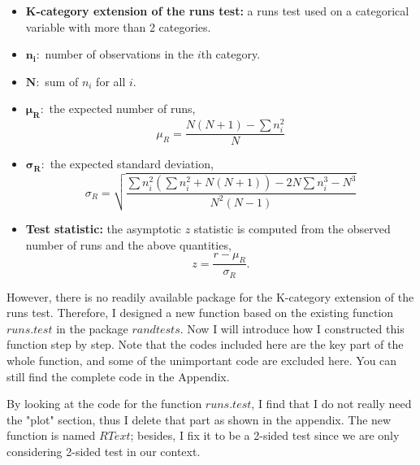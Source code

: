 \documentclass[12pt]{article}
\theoremstyle{plain}
\theoremstyle{definition}
\theoremstyle{remark}
\begin{document}
\begin{itemize}
    \item \textbf{K-category extension of the runs test:} a runs test used on a categorical variable with more than 2 categories.
    \item $\mathbf{n_i}:$ number of observations in the $i$th category.
    \item $\mathbf N:$ sum of $n_i$ for all $i$.
    \item $\mathbf{\mu_R}:$ the expected number of runs,
    $$\mu_R=\frac{N(N+1)-\sum n_i^2}{N}$$
    \item $\mathbf{\sigma_R}:$ the expected standard deviation,
    \[\sigma_R=\sqrt{\frac{\sum n_i^2(\sum n_i^2+N(N+1))-2N\sum n_i^3-N^3}{N^2(N-1)}}\]
    \item \textbf{Test statistic:} the asymptotic $z$ statistic is computed from the observed number of runs and the above quantities, $$z=\frac{r-\mu_R}{\sigma_R}.$$
\end{itemize}

However, there is no readily available package for the K-category extension of the runs test. Therefore, I designed a new function based on the existing function $runs.test$ in the package $randtests$. Now I will introduce how I constructed this function step by step. Note that the codes included here are the key part of the whole function, and some of the unimportant code are excluded here. You can still find the complete code in the Appendix.

By looking at the code for the function $runs.test$, I find that I do not really need the "plot" section, thus I delete that part as shown in the appendix. The new function is named $RText$; besides, I fix it to be a 2-sided test since we are only considering 2-sided test in our context.
 
\end{document}
